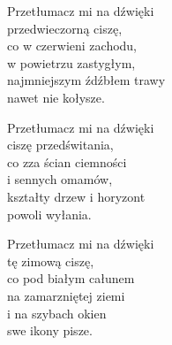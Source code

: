 \begin{text}
Przetłumacz mi na dźwięki\\
przedwieczorną ciszę,\\
co w czerwieni zachodu,\\
w powietrzu zastygłym,\\
najmniejszym źdźbłem trawy\\
nawet nie kołysze.

Przetłumacz mi na dźwięki\\
ciszę przedświtania,\\
co zza ścian ciemności\\
i sennych omamów,\\
kształty drzew i horyzont\\
powoli wyłania.

Przetłumacz mi na dźwięki\\
tę zimową ciszę,\\
co pod białym całunem\\
na zamarzniętej ziemi\\
i na szybach okien\\
swe ikony pisze.
\end{text}
\begin{chord}
\end{chord}
